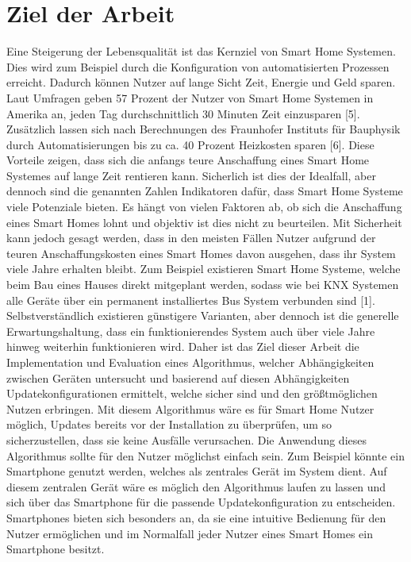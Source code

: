 \section{Ziel der Arbeit}

Eine Steigerung der Lebensqualität ist das Kernziel von Smart Home Systemen. Dies wird zum Beispiel durch die Konfiguration von 
automatisierten Prozessen erreicht. Dadurch können Nutzer auf lange Sicht Zeit, Energie und Geld sparen. Laut Umfragen geben 57 Prozent der Nutzer von
Smart Home Systemen in Amerika an, jeden Tag durchschnittlich 30 Minuten Zeit einzusparen [5].
Zusätzlich lassen sich nach Berechnungen des Fraunhofer Instituts für Bauphysik durch Automatisierungen bis zu ca. 40 Prozent Heizkosten 
sparen [6].
Diese Vorteile zeigen, dass sich die anfangs teure Anschaffung eines Smart Home Systemes auf lange Zeit rentieren kann.
Sicherlich 
ist dies der Idealfall, aber dennoch sind die genannten Zahlen Indikatoren dafür, dass Smart Home Systeme viele Potenziale bieten. Es hängt von 
vielen Faktoren ab, ob sich die Anschaffung eines Smart Homes lohnt und objektiv ist dies nicht zu beurteilen. Mit Sicherheit kann jedoch gesagt werden,
dass in den meisten Fällen Nutzer aufgrund der teuren Anschaffungskosten eines Smart Homes davon ausgehen, dass 
ihr System viele Jahre erhalten bleibt. 
Zum Beispiel existieren Smart Home Systeme, welche beim Bau eines Hauses direkt mitgeplant werden,
sodass wie bei KNX Systemen alle Geräte über ein permanent installiertes Bus System verbunden sind [1].
Selbstverständlich existieren günstigere Varianten, aber dennoch ist die generelle Erwartungshaltung, dass ein funktionierendes System
auch über viele Jahre hinweg weiterhin funktionieren wird.
Daher ist das Ziel dieser Arbeit die Implementation und Evaluation eines Algorithmus, welcher 
Abhängigkeiten zwischen Geräten untersucht und basierend auf diesen Abhängigkeiten Updatekonfigurationen 
ermittelt, welche sicher sind und den größtmöglichen Nutzen erbringen.
Mit diesem Algorithmus wäre es für Smart Home Nutzer möglich, Updates bereits vor der Installation zu überprüfen, um so sicherzustellen, 
dass sie keine Ausfälle verursachen. Die Anwendung dieses Algorithmus sollte für den Nutzer möglichst einfach sein. Zum
Beispiel könnte ein Smartphone genutzt werden, welches als zentrales Gerät im System dient. Auf diesem zentralen Gerät wäre es möglich den 
Algorithmus laufen zu lassen und sich über das Smartphone für die passende Updatekonfiguration zu entscheiden. Smartphones
bieten sich besonders an, da sie eine intuitive Bedienung für den Nutzer ermöglichen und im Normalfall jeder Nutzer eines Smart Homes
ein Smartphone besitzt.


